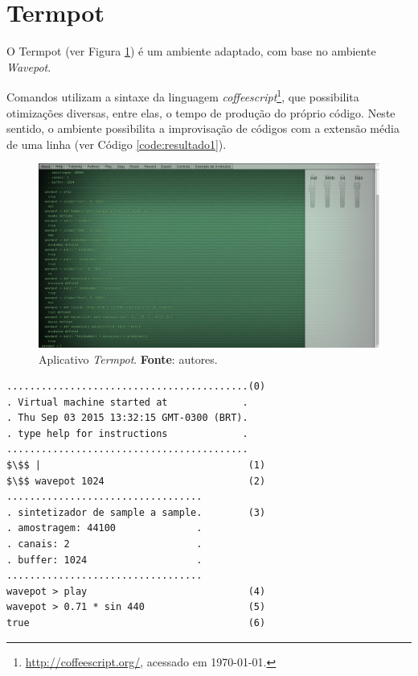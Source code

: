 \section{Termpot}\label{sec:termpot}

O Termpot (ver Figura \ref{fig:termpot}) é um ambiente adaptado, com base no ambiente \emph{Wavepot}.

Comandos utilizam a sintaxe da linguagem \emph{coffeescript}\cite{burnham2011coffeescript}\footnote{\url{http://coffeescript.org/}, acessado em \today.}, que possibilita otimizações diversas, entre elas, o tempo de produção do próprio código. Neste sentido, o ambiente possibilita a improvisação de códigos com a extensão média de uma linha (ver Código \ref{code:resultado1}). 

\begin{figure}[!h]
\centering
\includegraphics[scale=0.35]{termpot.png}
\caption{Aplicativo \emph{Termpot}. \textbf{Fonte}: autores.}
\label{fig:termpot}
\end{figure}

\begin{listing}
\begin{verbatim}
..........................................(0)
. Virtual machine started at             .
. Thu Sep 03 2015 13:32:15 GMT-0300 (BRT).
. type help for instructions             .
..........................................
$\$$ |                                    (1)
$\$$ wavepot 1024                         (2)
..................................
. sintetizador de sample a sample.        (3) 
. amostragem: 44100              .
. canais: 2                      .
. buffer: 1024                   .
..................................
wavepot > play                            (4)
wavepot > 0.71 * sin 440                  (5)
true                                      (6)
\end{verbatim}
\caption{Mensagem de inicialização do sistema (0). Console do \emph{Termpot} aguardando dados de entrada do improvisador (1). O improvisador inicia o ambiente \emph{wavepot} com um buffer de 1024 amostras por ciclo de DSP (2). Informações diversas do sistema de áudio inicializado (3). O improvisador inicia o processamento de áudio (4). O improvisador define o processamento de áudio (5). O sistema informa que o processamento ocorreu sem problemas (6).}
\label{code:resultado1}
\end{listing}

